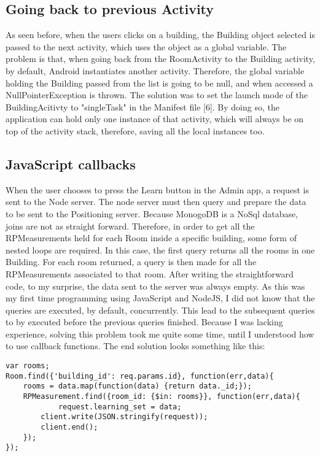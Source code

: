 \subsection{Going back to previous Activity}
As seen before, when the users clicks on a building, the Building object selected is passed to the next activity, which uses the object as a global variable. The problem is that, when going back from the RoomActivity to the Building activity, by default, Android instantiates another activity. Therefore, the global variable holding the Building passed from the list is going to be null, and when accessed a NullPointerException is thrown. The solution was to set the launch mode of the BuildingAcitivty to "singleTask" in the Manifest file [6]. By doing so, the application can hold only one instance of that activity, which will always be on top of the activity stack, therefore, saving all the local instances too.

\subsection{JavaScript callbacks} 
When the user chooses to press the Learn button in the Admin app, a request is sent to the Node server. The node server must then query and prepare the data to be sent to the Positioning server. Because MonogoDB is a NoSql database, joins are not as straight forward. Therefore, in order to get all the RPMeasurements held for each Room inside a specific building, some form of nested loops are required. In this case, the first query returns all the rooms in one Building. For each room returned, a query is then made for all the RPMeasurements associated to that room. After writing the straightforward code, to my surprise, the data sent to the server was always empty. As this was my first time programming using JavaScript and NodeJS, I did not know that the queries are executed, by default, concurrently. This lead to the subsequent queries to by executed before the previous queries finished. Because I was lacking experience, solving this problem took me quite some time, until I understood how to use callback functions. The end solution looks something like this:
\begin{lstlisting}
var rooms;
Room.find({'building_id': req.params.id}, function(err,data){
	rooms = data.map(function(data) {return data._id;});
    RPMeasurement.find({room_id: {$in: rooms}}, function(err,data){
    		request.learning_set = data;
        client.write(JSON.stringify(request));
        client.end();
    });
});
\end{lstlisting}

    

 





 
